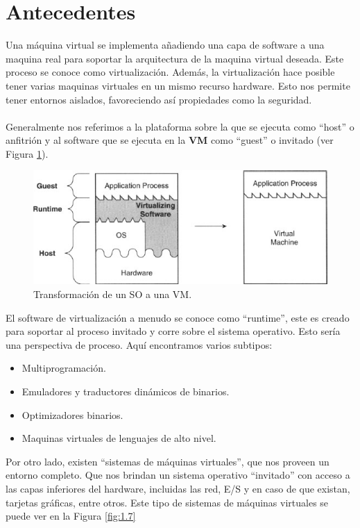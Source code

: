 \documentclass[11pt,a4paper]{article}
\begin{document}
\section{Antecedentes}
Una máquina virtual se implementa añadiendo una capa de software a una maquina real para soportar la arquitectura de la maquina virtual deseada. Este proceso se conoce como virtualización. Además, la virtualización hace posible tener varias maquinas virtuales en un mismo recurso hardware. Esto nos permite tener entornos aislados, favoreciendo así propiedades como la seguridad.\\\\
 Generalmente nos referimos a la plataforma sobre la que se ejecuta como ``host'' o anfitrión y al software que se ejecuta en la \textbf{VM} como ``guest'' o invitado (ver Figura \ref{fig:1.6}).
 \begin{figure}[H]
	\centering
	\includegraphics[scale=0.75]{images/fig16.jpg}
	\caption[Transformación de un SO a una VM]{Transformación de un SO a una VM.}
	\label{fig:1.6}
\end{figure}
 El software de virtualización a menudo se conoce como ``runtime'', este es creado para soportar al proceso invitado y corre sobre el sistema operativo. Esto sería  una perspectiva de proceso. Aquí encontramos varios subtipos:
 \begin{itemize}
     \item Multiprogramación.
     \item Emuladores y traductores dinámicos de binarios.
     \item Optimizadores binarios.
     \item Maquinas virtuales de lenguajes de alto nivel.
     
 \end{itemize}
Por otro lado, existen ``sistemas de máquinas virtuales'', que nos proveen un entorno completo. Que nos brindan un sistema operativo ``invitado'' con acceso a las capas inferiores del hardware, incluidas las red, E/S y en caso de que existan, tarjetas gráficas, entre otros. Este tipo de sistemas de máquinas virtuales se puede ver en la Figura \ref{fig:1.7}
\end{document}

